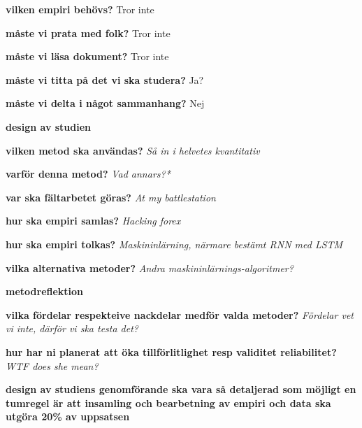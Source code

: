\textbf{vilken empiri behövs?} Tror inte

\textbf{måste vi prata med folk?} Tror inte

\textbf{måste vi läsa dokument?} Tror inte

\textbf{måste vi titta på det vi ska studera?} Ja?

\textbf{måste vi delta i något sammanhang?} Nej

\textbf{design av studien}

\textbf{vilken metod ska användas?}
\textit{Så in i helvetes kvantitativ}

\textbf{varför denna metod?}
\textit{Vad annars?*}

\textbf{var ska fältarbetet göras?}
\textit{At my battlestation}

\textbf{hur ska empiri samlas?}
\textit{Hacking forex}

\textbf{hur ska empiri tolkas?}
\textit{Maskininlärning, närmare bestämt RNN med LSTM}

\textbf{vilka alternativa metoder?}
\textit{Andra maskininlärnings-algoritmer?}

\textbf{metodreflektion}

\textbf{vilka fördelar respekteive nackdelar medför valda metoder?}
\textit{Fördelar vet vi inte, därför vi ska testa det?}

\textbf{hur har ni planerat att öka tillförlitlighet resp validitet reliabilitet?}
\textit{WTF does she mean?}

\textbf{design av studiens genomförande ska vara så detaljerad som möjligt en tumregel är att insamling och bearbetning av empiri och data ska utgöra 20\% av uppsatsen}
